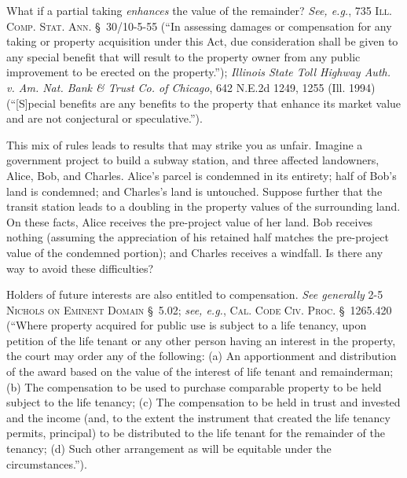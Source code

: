 What if a partial taking \textit{enhances} the value of the remainder?
\textit{See, e.g.}, 735 \textsc{Ill. Comp. Stat. Ann.} \S~30/10-5-55 (``In
assessing damages or compensation for any taking or property acquisition under
this Act, due consideration shall be given to any special benefit that will
result to the property owner from any public improvement to be erected on the
property.''); \emph{Illinois State Toll Highway Auth. v. Am. Nat. Bank \& Trust
Co. of Chicago}, 642 N.E.2d 1249, 1255 (Ill. 1994) (``[S]pecial benefits are any
benefits to the property that enhance its market value and are not conjectural
or speculative.''). 

This mix of rules leads to results that may strike you as unfair. Imagine a
government project to build a subway station, and three affected landowners,
Alice, Bob, and Charles. Alice's parcel is condemned in its entirety; half of
Bob's land is condemned; and Charles's land is untouched. Suppose further that
the transit station leads to a doubling in the property values of the
surrounding land. On these facts, Alice receives the pre-project value of her
land. Bob receives nothing (assuming the appreciation of his retained half
matches the pre-project value of the condemned portion); and Charles receives a
windfall. Is there any way to avoid these difficulties?

Holders of future interests are also entitled to compensation. \textit{See
generally} 2-5 \textsc{Nichols on Eminent Domain} \S~5.02; \textit{see, e.g.},
\textsc{Cal. Code Civ. Proc.} \S~1265.420 (``Where property acquired for public
use is subject to a life tenancy, upon petition of the life tenant or any other
person having an interest in the property, the court may order any of the
following: (a) An apportionment and distribution of the award based on the value
of the interest of life tenant and remainderman; (b) The compensation to be used
to purchase comparable property to be held subject to the life tenancy; (c) The
compensation to be held in trust and invested and the income (and, to the extent
the instrument that created the life tenancy permits, principal) to be
distributed to the life tenant for the remainder of the tenancy; (d) Such other
arrangement as will be equitable under the circumstances.''). 


